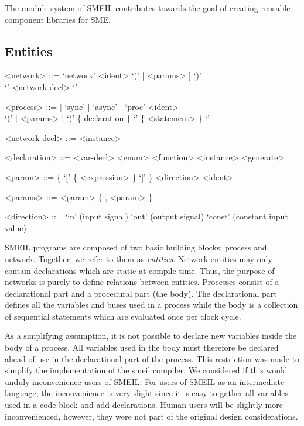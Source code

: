 The module system of SMEIL contributes towards the goal of creating reusable
component libraries for SME. 



\subsection{Entities}
\begin{grammar}
  <network> ::= `network' <ident> `(' [ <params> ] `)' \\`{' <network-decl> `}'

  <process> ::= [ `sync' | `async' ] `proc' <ident> \\ `(' [
             <params> ] `)' \{ declaration \} `{' \{ <statement> \} `}'

  <network-decl> ::= <instance>

  <declaration> ::= <var-decl>
  \alt <enum>
  \alt <function>
  \alt <instance>
  \alt <generate>
  
  <param> ::= \{ `[' \{ <expression> \} `]' \} <direction> <ident>

  <params> ::= <param> \{ , <param> \}

  <direction> ::= `in' (input signal)
  \alt `out' (output signal)
  \alt `const' (constant input value)  
\end{grammar}

SMEIL programs are composed of two basic building blocks: {\ttfamily
  process} and {\ttfamily network}. Together, we refer to them as {\itshape
  entities}. Network entities may only contain declarations which are static at
compile-time. Thus, the purpose of networks is purely to define relations
between entities.  Processes consist of a declarational part and a procedural
part (the body). The declarational part defines all the variables and buses used
in a process while the body is a collection of sequential statements which are
evaluated once per clock cycle.

As a simplifying assumption, it is not possible to declare new variables inside
the body of a process. All variables used in the body must therefore be declared
ahead of use in the declarational part of the process. This restriction was made
to simplify the implementation of the \gls{smeil} compiler. We considered if
this would unduly inconvenience users of SMEIL: For users of SMEIL as an
intermediate language, the inconvenience is very slight since it is easy to
gather all variables used in a code block and add declarations. Human users will
be slightly more inconvenienced, however, they were not part of the original
design considerations.

